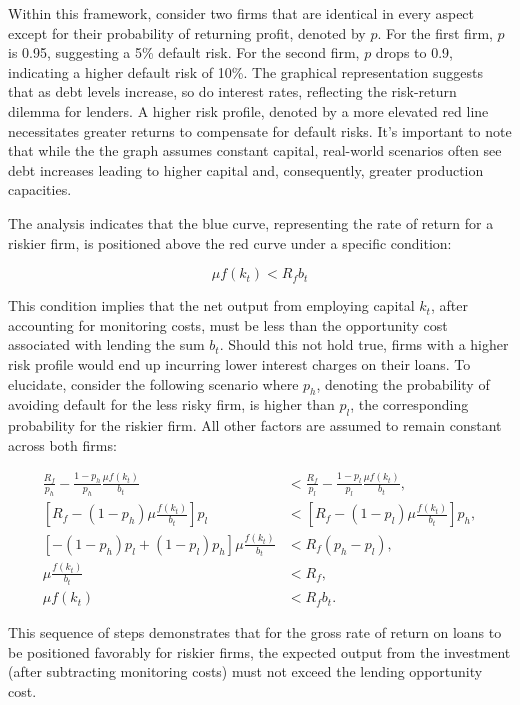 \documentclass[12pt]{report}
\begin{document}
Within this framework, consider two firms that are identical in every aspect except for their probability of returning
profit, denoted by \(p\). For the first firm, \(p\) is 0.95, suggesting a 5\% default risk. For the second firm, \(p\)
drops to 0.9, indicating a higher default risk of 10\%. The graphical representation suggests that as debt levels
increase, so do interest rates, reflecting the risk-return dilemma for lenders. A higher risk profile, denoted by a more
elevated red line necessitates greater returns to compensate for default risks. It's important to note that while the
the graph assumes constant capital, real-world scenarios often see debt increases leading to higher capital and,
consequently, greater production capacities.

The analysis indicates that the blue curve, representing the rate of return for a riskier firm, is positioned above the red curve under a specific condition:

\begin{equation}
    \mu f(k_t) < R_f b_t
\end{equation}

This condition implies that the net output from employing capital \(k_t\), after accounting for monitoring costs, must
be less than the opportunity cost associated with lending the sum \(b_t\). Should this not hold true, firms with a
higher risk profile would end up incurring lower interest charges on their loans. To elucidate, consider the following
scenario where \(p_h\),  denoting the probability of avoiding default for the less risky firm, is higher than \(p_l\),
the corresponding probability for the riskier firm. All other factors are assumed to remain constant across both firms:

\begin{align*}
    \frac{R_f}{p_h}  -\frac{1 - p_h}{p_h}\frac{\mu f(k_t)}{b_t} &< \frac{R_f}{p_l} - \frac{1 - p_l}{p_l}\frac{\mu f(k_t)}{b_t}, \\
    \left[R_f - (1 - p_h) \mu \frac{f(k_t)}{b_t}\right] p_l &< \left[R_f - (1 - p_l) \mu \frac{f(k_t)}{b_t}\right] p_h,\\
    \left[-(1 - p_h)p_l + (1 - p_l)p_h\right] \mu \frac{f(k_t)}{b_t} &< R_f (p_h - p_l),\\
    \mu \frac{f(k_t)}{b_t} &< R_f,\\
    \mu f(k_t) &< R_f b_t.
\end{align*}

This sequence of steps demonstrates that for the gross rate of return on loans to be positioned favorably for riskier firms,
the expected output from the investment (after subtracting monitoring costs) must not exceed the lending opportunity
cost.
\end{document}
